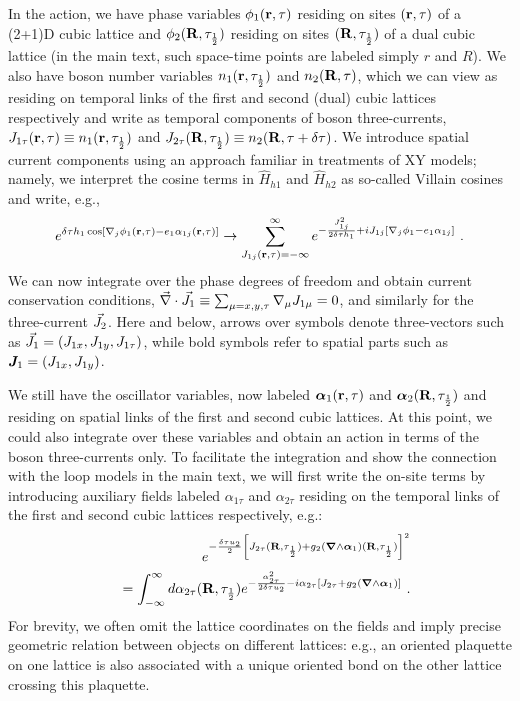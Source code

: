 In the action, we have phase variables $\phi_1({\bf r}, \tau)$ residing on sites $({\bf r}, \tau)$ of a (2+1)D cubic lattice and $\phi_2({\bf R}, \tau_{\frac{1}{2}})$ residing on sites $({\bf R}, \tau_{\frac{1}{2}})$ of a dual cubic lattice (in the main text, such space-time points are labeled simply $r$ and $R$).  We also have boson number variables $n_1({\bf r}, \tau_{\frac{1}{2}})$ and $n_2({\bf R}, \tau)$, which we can view as residing on temporal links of the first and second (dual) cubic lattices respectively and write as temporal components of boson three-currents, $J_{1\tau}({\bf r}, \tau) \equiv n_1({\bf r}, \tau_{\frac{1}{2}})$ and $J_{2\tau}({\bf R}, \tau_{\frac{1}{2}}) \equiv n_2({\bf R}, \tau + \delta\tau)$.  We introduce spatial current components using an approach familiar in treatments of XY models; namely, we interpret the cosine terms in $\hat{H}_{h1}$ and $\hat{H}_{h2}$ as so-called Villain cosines and write, e.g.,
\begin{eqnarray*}
 e^{\delta\tau h_1 \cos[\nabla_j \phi_1({\bf r}, \tau) - e_1 \alpha_{1j}({\bf r}, \tau)]} 
 \to \sum_{J_{1j}({\bf r}, \tau) = -\infty}^\infty e^{-\frac{J_{1j}^2}{2 \delta\tau h_1} + i J_{1j} [\nabla_j \phi_1 - e_1 \alpha_{1j}]} ~.
\end{eqnarray*}
We can now integrate over the phase degrees of freedom and obtain current conservation conditions, $\vec{\nabla} \cdot {\vec{J}}_1 \equiv \sum_{\mu=x, y, \tau} \nabla_\mu J_{1\mu} = 0$, and similarly for the three-current ${\vec{J}}_2$.
Here and below, arrows over symbols denote three-vectors such as ${\vec{J}}_1 = (J_{1x}, J_{1y}, J_{1\tau})$, while bold symbols refer to spatial parts such as ${\bm {J}}_1 = (J_{1x}, J_{1y})$.

We still have the oscillator variables, now labeled ${\bm \alpha}_1({\bf r}, \tau)$ and ${\bm \alpha}_2({\bf R}, \tau_{\frac{1}{2}})$ and residing on spatial links of the first and second cubic lattices.  At this point, we could also integrate over these variables and obtain an action in terms of the boson three-currents only.  To facilitate the integration and show the connection with the loop models in the main text, we will first write the on-site terms by introducing auxiliary fields labeled $\alpha_{1\tau}$ and $\alpha_{2\tau}$ residing on the temporal links of the first and second cubic lattices respectively, e.g.:
\begin{eqnarray*}
&& e^{-\frac{\delta\tau u_2}{2} \left[J_{2\tau}({\bf R}, \tau_{\frac{1}{2}}) + g_2 ({\bm \nabla} \wedge {\bm \alpha}_1)({\bf R}, \tau_{\frac{1}{2}}) \right]^2} \\
&& = \int_{-\infty}^\infty d\alpha_{2\tau}({\bf R}, \tau_{\frac{1}{2}}) e^{-\frac{\alpha_{2\tau}^2}{2 \delta\tau u_2} - i \alpha_{2\tau} \left[J_{2\tau} + g_2 ({\bm \nabla} \wedge {\bm \alpha}_1) \right]} ~.
\end{eqnarray*}
For brevity, we often omit the lattice coordinates on the fields and imply precise geometric relation between objects on different lattices: e.g., an oriented plaquette on one lattice is also associated with a unique oriented bond on the other lattice crossing this plaquette.

